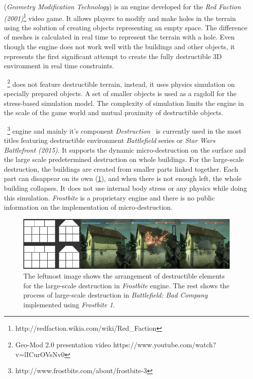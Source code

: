  (\emph{Geometry Modification Technology}\cite{geomod}) is an engine developed for the \emph{Red Faction (2001)}\footnote{http://redfaction.wikia.com/wiki/Red\_Faction} video game. It allows players to modify and make holes in the terrain using the solution of creating objects representing an empty space. The difference of meshes is calculated in real time to represent the terrain with a hole. Even though the engine does not work well with the buildings and other objects, it represents the first significant attempt to create the fully destructible 3D environment in real time constraints.

~\cite{geomod}\footnote{Geo-Mod 2.0 presentation video https://www.youtube.com/watch?v=lICurOVsNv0} does not feature destructible terrain, instead, it uses physics simulation on specially prepared objects. A set of smaller objects is used as a ragdoll for the stress-based simulation model. The complexity of simulation limits the engine in the scale of the game world and mutual proximity of destructible objects.


~\footnote{http://www.frostbite.com/about/frostbite-3} engine and mainly it's component \emph{Destruction}~\cite{destruction} is currently used in the most titles featuring destructible environment \eg \emph{Battlefield} series or \emph{Star Wars Battlefront (2015)}. It supports the dynamic micro-destruction on the surface and the large scale predetermined destruction on whole buildings. For the large-scale destruction, the buildings are created from smaller parts linked together. Each part can disappear on its own (\cref{fig:frostbite}), and when there is not enough left, the whole building collapses. It does not use internal body stress or any physics while doing this simulation. \emph{Frostbite} is a proprietary engine and there is no public information on the implementation of micro-destruction.

\begin{figure}
\centering
\includegraphics[width=\textwidth]{img/frostbite}
\caption{The leftmost image shows the arrangement of destructible elements for the large-scale destruction in \emph{Frostbite} engine. The rest shows the process of large-scale destruction in \emph{Battlefield: Bad Company} implemented using \emph{Frostbite 1}.}
\label{fig:frostbite}
\end{figure}

